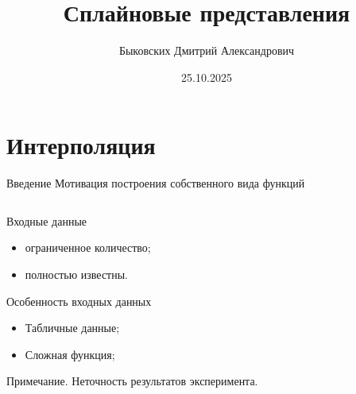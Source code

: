 \documentclass{beamer}
\title[Сплайны]{Сплайновые представления}
\author[Быковских Д.А.]{Быковских Дмитрий Александрович}
\date{25.10.2025}
\begin{document}
	\begin{frame}
		\titlepage
	\end{frame}

	\section{Интерполяция}

	\begin{frame}{Введение} {Мотивация построения собственного вида функций}
	
		\begin{columns}
			\begin{column}{0.5\textwidth}
				Входные данные
				\begin{itemize}
					\item ограниченное количество;
					\item полностью известны.
				\end{itemize}
				Особенность входных данных
				\begin{itemize}
					\item Табличные данные;
					\item Сложная функция;
				\end{itemize}
				Примечание. Неточность результатов эксперимента.
					

\end{column}
\end{columns}
\end{frame}
\end{document}
